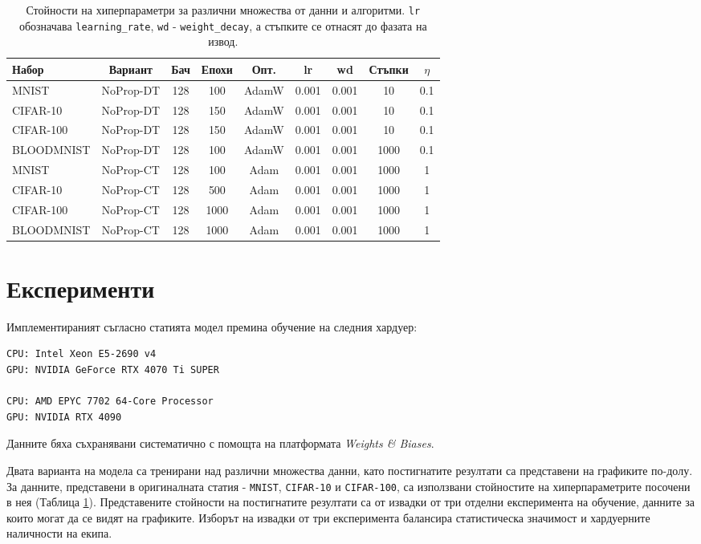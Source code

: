 \documentclass[a4paper,11pt]{article}
\begin{document}
\begin{table}[H]
  \centering
  \renewcommand{\arraystretch}{1.5} %
  \begin{tabular}{lcccccccc}
    \toprule
    \textbf{Набор} & \textbf{Вариант} & \textbf{Бач} & \textbf{Епохи} & \textbf{Опт.} & \textbf{lr} & \textbf{wd} & \textbf{Стъпки} & \textbf{$\eta$} \\
    \midrule
    MNIST & NoProp-DT & 128 & 100 & AdamW & 0.001 & 0.001 & 10 & 0.1 \\
    CIFAR-10 & NoProp-DT & 128 & 150 & AdamW & 0.001 & 0.001 & 10 & 0.1 \\
    CIFAR-100 & NoProp-DT & 128 & 150 & AdamW & 0.001 & 0.001 & 10 & 0.1 \\
    BLOODMNIST & NoProp-DT & 128 & 100 & AdamW & 0.001 & 0.001 & 1000 & 0.1 \\
    MNIST & NoProp-CT & 128 & 100 & Adam & 0.001 & 0.001 & 1000 & 1 \\
    CIFAR-10 & NoProp-CT & 128 & 500 & Adam & 0.001 & 0.001 & 1000 & 1 \\
    CIFAR-100 & NoProp-CT & 128 & 1000 & Adam & 0.001 & 0.001 & 1000 & 1 \\
    BLOODMNIST & NoProp-CT & 128 & 1000 & Adam & 0.001 & 0.001 & 1000 & 1 \\
    \bottomrule
  \end{tabular}
  \caption{Стойности на хиперпараметри за различни множества от данни и алгоритми. \texttt{lr} обозначава \texttt{learning\_rate}, \texttt{wd} - \texttt{weight\_decay}, а стъпките се отнасят до фазата на извод. }
  \label{tab:hyperparameters_values}
\end{table}

\section{Експерименти}

Имплементираният съгласно статията модел премина обучение на следния хардуер:
\begin{lstlisting}
CPU: Intel Xeon E5-2690 v4
GPU: NVIDIA GeForce RTX 4070 Ti SUPER

CPU: AMD EPYC 7702 64-Core Processor
GPU: NVIDIA RTX 4090
\end{lstlisting}

Данните бяха съхранявани систематично с помощта на платформата \emph{Weights \& Biases}. 

Двата варианта на модела са тренирани над различни множества данни, като постигнатите резултати са представени на графиките по-долу. За данните, представени в оригиналната статия - \texttt{MNIST}, \texttt{CIFAR-10} и \texttt{CIFAR-100}, са използвани стойностите на хиперпараметрите посочени в нея (Таблица \ref{tab:hyperparameters_values}). Представените стойности на постигнатите резултати са от извадки от три отделни експеримента на обучение, данните за които могат да се видят на графиките. Изборът на извадки от три експеримента балансира статистическа значимост и хардуерните наличности на екипа. 
\end{document}
